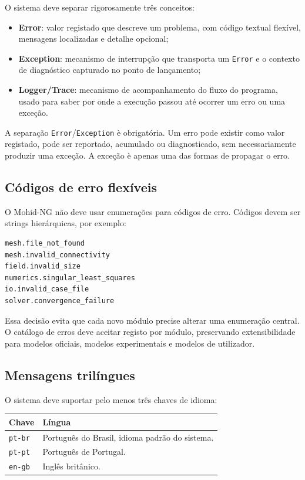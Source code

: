 \documentclass[11pt,a4paper]{article}
\begin{document}
O sistema deve separar rigorosamente tr\^es conceitos:
\begin{itemize}
  \item \textbf{Error}: valor registado que descreve um problema, com c\'odigo textual flex\'ivel, mensagens localizadas e detalhe opcional;
  \item \textbf{Exception}: mecanismo de interrup\c{c}\~ao que transporta um \texttt{Error} e o contexto de diagn\'ostico capturado no ponto de lan\c{c}amento;
  \item \textbf{Logger/Trace}: mecanismo de acompanhamento do fluxo do programa, usado para saber por onde a execu\c{c}\~ao passou at\'e ocorrer um erro ou uma exce\c{c}\~ao.
\end{itemize}

A separa\c{c}\~ao \texttt{Error}/\texttt{Exception} \`e obrigat\'oria. Um erro pode existir como valor registado, pode ser reportado, acumulado ou diagnosticado, sem necessariamente produzir uma exce\c{c}\~ao. A exce\c{c}\~ao \`e apenas uma das formas de propagar o erro.

\subsection{C\'odigos de erro flex\'iveis}

O Mohid-NG n\~ao deve usar enumera\c{c}\~oes para c\'odigos de erro. C\'odigos devem ser strings hier\'arquicas, por exemplo:
\begin{lstlisting}[style=tree]
mesh.file_not_found
mesh.invalid_connectivity
field.invalid_size
numerics.singular_least_squares
io.invalid_case_file
solver.convergence_failure
\end{lstlisting}

Essa decis\~ao evita que cada novo m\'odulo precise alterar uma enumera\c{c}\~ao central. O cat\'alogo de erros deve aceitar registo por m\'odulo, preservando extensibilidade para modelos oficiais, modelos experimentais e modelos de utilizador.

\subsection{Mensagens tril\'ingues}

O sistema deve suportar pelo menos tr\^es chaves de idioma:
\begin{longtable}{p{}p{}}
\toprule
\textbf{Chave} & \textbf{L\'ingua}\\
\midrule
\texttt{pt-br} & Portugu\^es do Brasil, idioma padr\~ao do sistema.\\
\texttt{pt-pt} & Portugu\^es de Portugal.\\
\texttt{en-gb} & Ingl\^es brit\^anico.\\
\bottomrule
\end{longtable}
\end{document}
